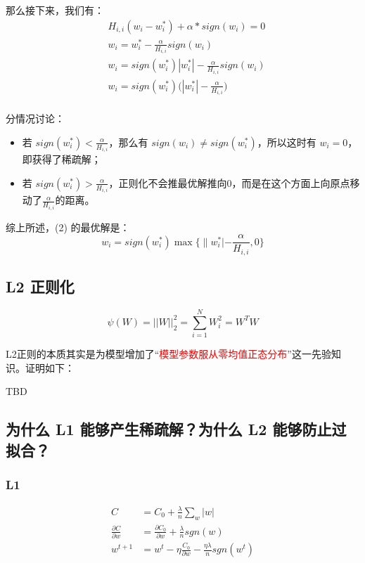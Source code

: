 \documentclass[12pt]{article}
\begin{document}
那么接下来，我们有：
\begin{align*}
&H_{i,i} (w_i - w^*_i) + \alpha * sign(w_i) = 0 \\
& w_i = w^*_i - \frac{\alpha}{H_{i,i}} sign(w_i) \\
& w_i = sign(w^*_i)|w^*_i| - \frac{\alpha}{H_{i,i}} sign(w_i)  \\
& w_i = sign(w^*_i) \Big(|w^*_i| - \frac{\alpha}{H_{i,i}}\Big) \\
\end{align*}

分情况讨论：
\begin{itemize}
\setlength{\itemsep}{0pt}
\setlength{\parsep}{0pt}
\setlength{\parskip}{0pt}
    \item  若 $sign(w^*_i) <  \frac{\alpha}{H_{i,i}}$，那么有 $sign(w_i) \neq sign(w^*_i)$，所以这时有 $w_i = 0$，即获得了稀疏解；
    \item 若 $sign(w^*_i) > \frac{\alpha}{H_{i,i}}$，正则化不会推最优解推向0，而是在这个方面上向原点移动了$\frac{\alpha}{H_{i,i}}$的距离。
\end{itemize}

综上所述，(2) 的最优解是：
$$
w_i = sign(w^*_i) \max\Big\{\|w^*_i| - \frac{\alpha}{H_{i,i}}, 0 \Big\}
$$
\subsection{L2 正则化}
$$
\psi(W) = ||W||_2^2 = \sum_{i=1}^NW_i^2 = W^TW
$$

L2正则的本质其实是为模型增加了“\textcolor{red}{模型参数服从零均值正态分布}”这一先验知识。证明如下：

TBD

\subsection{为什么 L1 能够产生稀疏解？为什么 L2 能够防止过拟合？\cite{Normalization_Method_L1_L2}\cite{Normalization_In_Machine_Learning}}

\subsubsection{L1}
\begin{align}
     C &= C_0 + \frac{\lambda}{n}\sum_{w}|w| \\
     \frac{\partial C}{\partial w} &= \frac{\partial C_0}{\partial w} + \frac{\lambda}{n}sgn(w) \\
     w^{t+1} &= w^t - \eta\frac{C_0}{\partial w} - \frac{\eta\lambda}{n}sgn(w^t) \\
\end{align}
\end{document}

